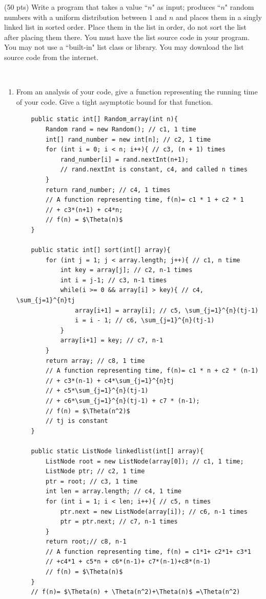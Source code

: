 \documentclass{article}
\newenvironment{sol}[1][Solution]{\begin{trivlist}\item[\hskip\labelsep {\bfseries #1:}]}{\end{trivlist}}
\begin{document}
\begin{enumerate}
\begin{sol}
\begin{enumerate}
\end{enumerate}
    \end{sol}
    \item (50 pts) Write a program that takes a value ``$n$" as input; produces ``$n$" random numbers with a uniform distribution between $1$ and $n$ and places them in a singly linked list in sorted order.  Place them in the list in order, do not sort the list after placing them there.  You must have the list source code in your program. You may not use a ``built-in" list class or library. You may download the list source code from the internet.
    \begin{sol}
    ~\
    \begin{enumerate}
        \item From an analysis of your code, give a function representing the running time of your code. Give a tight asymptotic bound for that function. 
\begin{verbatim}
    public static int[] Random_array(int n){
        Random rand = new Random(); // c1, 1 time
        int[] rand_number = new int[n]; // c2, 1 time
        for (int i = 0; i < n; i++){ // c3, (n + 1) times
            rand_number[i] = rand.nextInt(n+1);
            // rand.nextInt is constant, c4, and called n times
        }
        return rand_number; // c4, 1 times
        // A function representing time, f(n)= c1 * 1 + c2 * 1 
        // + c3*(n+1) + c4*n;
        // f(n) = $\Theta(n)$
    }

    public static int[] sort(int[] array){
        for (int j = 1; j < array.length; j++){ // c1, n time
            int key = array[j]; // c2, n-1 times
            int i = j-1; // c3, n-1 times
            while(i >= 0 && array[i] > key){ // c4, \sum_{j=1}^{n}tj
                array[i+1] = array[i]; // c5, \sum_{j=1}^{n}(tj-1)
                i = i - 1; // c6, \sum_{j=1}^{n}(tj-1)
            }
            array[i+1] = key; // c7, n-1
        }
        return array; // c8, 1 time
        // A function representing time, f(n)= c1 * n + c2 * (n-1) 
        // + c3*(n-1) + c4*\sum_{j=1}^{n}tj  
        // + c5*\sum_{j=1}^{n}(tj-1) 
        // + c6*\sum_{j=1}^{n}(tj-1) + c7 * (n-1);
        // f(n) = $\Theta(n^2)$
        // tj is constant
    }

    public static ListNode linkedlist(int[] array){
        ListNode root = new ListNode(array[0]); // c1, 1 time;
        ListNode ptr; // c2, 1 time
        ptr = root; // c3, 1 time
        int len = array.length; // c4, 1 time
        for (int i = 1; i < len; i++){ // c5, n times
            ptr.next = new ListNode(array[i]); // c6, n-1 times
            ptr = ptr.next; // c7, n-1 times
        } 
        return root;// c8, n-1 
        // A function representing time, f(n) = c1*1+ c2*1+ c3*1
        // +c4*1 + c5*n + c6*(n-1)+ c7*(n-1)+c8*(n-1)
        // f(n) = $\Theta(n)$
    }
    // f(n)= $\Theta(n) + \Theta(n^2)+\Theta(n)$ =\Theta(n^2)


\end{verbatim}
\end{enumerate}
\end{sol}
\end{enumerate}
\end{document}
